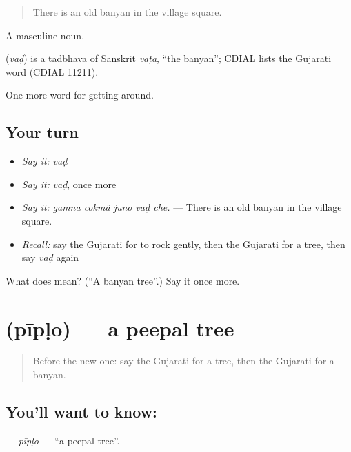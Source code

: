 \begin{quote}
There is an old banyan in the village square.
\end{quote}

A masculine noun.

\begin{cousinweb}
\textbf{} (\emph{vaḍ}) is a tadbhava of Sanskrit \emph{vaṭa}, \textquotedblleft{}the banyan\textquotedblright{}; CDIAL lists the Gujarati word (CDIAL 11211).
\end{cousinweb}

\begin{grammarlens}[title={What you've built}]
One more word for getting around.
\end{grammarlens}

\subsection*{Your turn}
\begin{itemize}
\raggedright
  \item \emph{Say it:} \emph{vaḍ}
  \item \emph{Say it:} \emph{vaḍ}, once more
  \item \emph{Say it:} \emph{gāmnā cokmā̃ jūno vaḍ che.} — There is an old banyan in the village square.
  \item \emph{Recall:} say the Gujarati for to rock gently, then the Gujarati for a tree, then say \emph{vaḍ} again
\end{itemize}

\begin{tcolorbox}[breakable,colback=teal!4,colframe=teal!35!black,title={Before you move on}]
What does  mean? (\textquotedblleft{}A banyan tree\textquotedblright{}.) Say it once more.
\end{tcolorbox}
\section[\texorpdfstring{\gu{પીપળો} (pīpḷo)}{પીપળો (pīpḷo)}]{ (pīpḷo) — a peepal tree}

\label{lesson:GU-C443-piplo}



\begin{quote}
Before the new one: say the Gujarati for a tree, then the Gujarati for a banyan.
\end{quote}

\subsection*{You'll want to know: }
\textbf{} — \emph{pīpḷo} — \textquotedblleft{}a peepal tree\textquotedblright{}.

